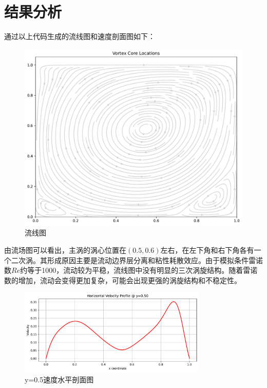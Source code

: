 \documentclass[12pt,a4paper]{article}
\begin{document}
\section{结果分析}
通过以上代码生成的流线图和速度剖面图如下：
\begin{figure}[H]
    \centering
    \includegraphics[width=1\textwidth]{1_streamlines.pdf}
    \caption{流线图}
    \label{fig:streamline}
\end{figure}
由流场图可以看出，主涡的涡心位置在$(0.5, 0.6)$左右，在左下角和右下角各有一个二次涡。其形成原因主要是流动边界层分离和粘性耗散效应。由于模拟条件雷诺数$Re$约等于1000，流动较为平稳，流线图中没有明显的三次涡旋结构。随着雷诺数的增加，流动会变得更加复杂，可能会出现更强的涡旋结构和不稳定性。
\begin{figure}[H]
    \centering
    \includegraphics[width=0.8\textwidth]{2_horizontal_profile.pdf}
    \caption{y=0.5速度水平剖面图}
    \label{fig:horizontal_profile_a}
\end{figure}
\end{document}
